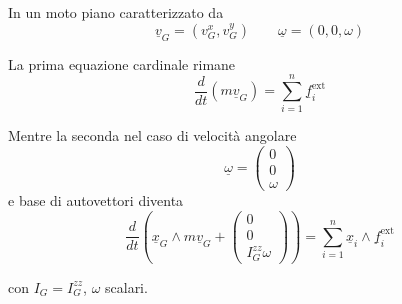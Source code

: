 \begin{oss}{}
In un moto piano caratterizzato da
\[
\underline{v}_G=\left(v_G^x,v_G^y\right)
\qquad
\underline{\omega}=(0,0,\omega)
\]

La prima equazione cardinale rimane
\[
\frac{d}{dt}\left(m\underline{v}_G\right)=\sum_{i=1}^{n}\underline{f}_i^{\mathrm{ext}}
\]

Mentre la seconda nel caso di velocità angolare
\[
\underline{\omega}=
\begin{pmatrix}
0\\
0\\
\omega
\end{pmatrix}
\]
e base di autovettori diventa
\[
\frac{d}{dt}\left(\underline{x}_G\wedge m\underline{v}_G+
\begin{pmatrix}
0\\
0\\
I_G^{zz}\omega
\end{pmatrix}
\right)
=
\sum_{i=1}^{n}\underline{x}_i\wedge \underline{f}_i^{\mathrm{ext}}
\]

con \(I_G=I_G^{zz}\), \(\omega\) scalari.
\end{oss}

